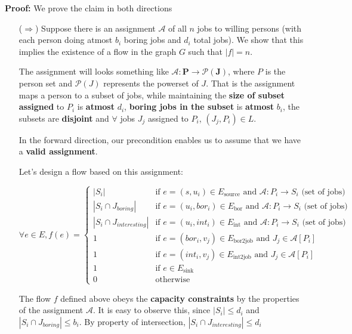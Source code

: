 \documentclass[11pt, fleqn]{article}
\begin{document}
\textbf{Proof: } We prove the claim in both directions
\begin{itemize}
    \item[($\Rightarrow$)] Suppose there is an assignment $\mathcal{A}$ of all $n$ jobs to willing persons (with each person doing atmost $b_i$ boring jobs and $d_i$  total jobs). We show that this implies the existence of a flow in the graph $G$ such that $|f|=n$. 
    
    The assignment will looks something like $\boldsymbol{\mathcal{A}: P \longrightarrow \mathcal{P}(J)}$, where $P$ is the person set and $\mathcal{P}(J)$ represents the powerset of $J$. That is the assignment maps a person to a subset of jobs, while maintaining the \textbf{size of subset assigned} to $P_i$ is \textbf{atmost} $d_i$, \textbf{boring jobs in the subset} is \textbf{atmost} $b_i$, the subsets are \textbf{disjoint} and $\forall$ jobs $J_j$ assigned to $P_i$, $(J_j,P_i) \in L$. 
    
    In the forward direction, our precondition enables us to assume that we have a \textbf{valid assignment}.
    
    Let's design a flow based on this assignment:
    
    
    $$\forall e\in E, f(e)=\begin{cases}
    |S_i| & \text{if } e = (s,u_i) \in E_{\text{source}} \text{ and } \mathcal{A}: P_i \longrightarrow S_i \text{ (set of jobs)} \\
    |S_i \cap J_{boring}| & \text{if } e = (u_i,bor_i) \in E_{\text{bor}} \text{ and } \mathcal{A}: P_i \longrightarrow S_i \text{ (set of jobs)}\\
    |S_i \cap J_{interesting}| & \text{if } e = (u_i,int_i) \in E_{\text{int}} \text{ and } \mathcal{A}: P_i \longrightarrow S_i \text{ (set of jobs)}\\
    1 & \text{if } e = (bor_i,v_j) \in E_{\text{bor2job}} \text{ and $J_j \in \mathcal{A}[P_i]$ } \\
    1 & \text{if } e = (int_i,v_j) \in E_{\text{int2job}} \text{ and $J_j \in \mathcal{A}[P_i]$ }\\
    1 & \text{if } e \in E_{\text{sink}}\\
    0 & \text{otherwise}
    \end{cases}$$
    
    The flow $f$ defined above obeys the \textbf{capacity constraints} by the properties of the assignment $\mathcal{A}$. It is easy to observe this, since $|S_i| \leq d_i$ and $|S_i \cap J_{boring}| \leq b_i$. By property of intersection, $|S_i \cap J_{interesting}| \leq d_i$
    

\end{itemize}
\end{document}
